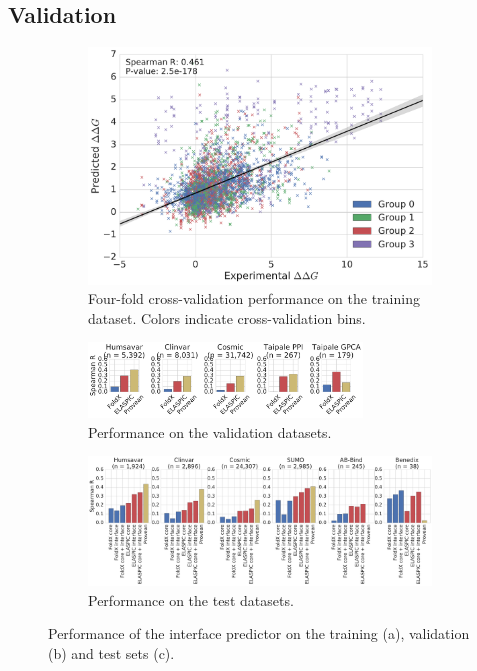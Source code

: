 \subsection{Validation}

\begin{figure}[ht]

	\begin{subfigure}[b]{1.0\textwidth}
		\centering
		\includegraphics[width=0.6\linewidth]{static/elaspic_training_set/validation/crossvalidation_performance_interface.pdf}
		\caption{Four-fold cross-validation performance on the training dataset. Colors indicate cross-validation bins.}
		\vspace*{10mm}
	\end{subfigure}

	\begin{subfigure}[b]{1.0\textwidth}
		\centering
		\includegraphics[width=0.8\textwidth]{static/elaspic_training_set/validation/validation_performance_interface.pdf}
		\caption{Performance on the validation datasets.}
		\vspace*{10mm}
	\end{subfigure}

	\begin{subfigure}[b]{1.0\textwidth}
		\centering
		\includegraphics[width=1.0\textwidth]{static/elaspic_training_set/validation/test_performance_interface.pdf}
		\caption{Performance on the test datasets.}
	\end{subfigure}

	\caption[Interface predictor validation.]{Performance of the interface predictor on the training (a), validation (b) and test sets (c).}
\end{figure}

